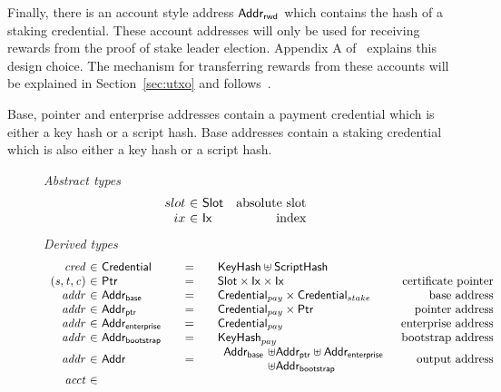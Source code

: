 Finally, there is an account style address $\mathsf{Addr_{rwd}}$ which contains the hash of
a staking credential. These account addresses will only be used for receiving
rewards from the proof of stake leader election. Appendix A
of~\cite{delegation_design} explains this design choice.  The mechanism for
transferring rewards from these accounts will be explained in
Section~\ref{sec:utxo} and follows~\cite{chimeric}.

Base, pointer and enterprise addresses contain a payment credential which is
either a key hash or a script hash. Base addresses contain a staking credential
which is also either a key hash or a script hash.

\begin{figure*}[hbt]
  \emph{Abstract types}
  \begin{equation*}
    \begin{array}{r@{~\in~}lr}
      slot & \Slot & \text{absolute slot}\\
      ix & \Ix & \text{index}\\
    \end{array}
  \end{equation*}
  \emph{Derived types}
  \begin{equation*}
    \begin{array}{r@{~\in~}l@{\qquad=\qquad}lr}
      \var{cred} & \Credential & \KeyHash\uniondistinct\HashScr \\
      \var{(s,t,c)}
      & \Ptr
      & \Slot\times\Ix\times\Ix
      & \text{certificate pointer}
      \\
      \var{addr}
      & \AddrB
      & \Credential_{pay}\times\Credential_{stake}
      & \text{base address}
      \\
      \var{addr}
      & \AddrP
      & \Credential_{pay}\times\Ptr
      & \text{pointer address}
      \\
      \var{addr}
      & \AddrE
      & \Credential_{pay}
      & \text{enterprise address}
      \\
      \var{addr}
      & \AddrBS
      & \KeyHash_{pay}
      & \text{bootstrap address}
      \\
      \var{addr}
      & \Addr
      & \begin{array}{l@{~\uniondistinct}l}
          \AddrB & \AddrP \uniondistinct \AddrE
          \\
                 & \AddrBS
        \end{array}
      & \text{output address}
      \\
      \var{acct}

\end{array}
\end{equation*}
\end{figure*}
